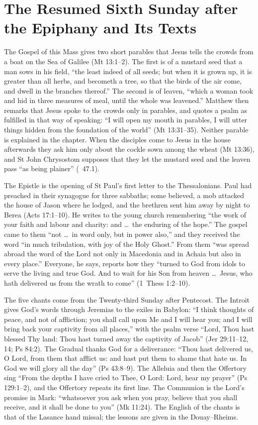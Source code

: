 \section{The Resumed Sixth Sunday after the Epiphany and Its Texts}
\label{sec:opening}

The Gospel of this Mass gives two short parables that Jesus tells the crowds
from a boat on the Sea of Galilee (Mt 13:1--2). The first is of a mustard seed
that a man sows in his field, ``the least indeed of all seeds; but when it is
grown up, it is greater than all herbs, and becometh a tree, so that the birds
of the air come, and dwell in the branches thereof.'' The second is of leaven,
``which a woman took and hid in three measures of meal, until the whole was
leavened.'' Matthew then remarks that Jesus spoke to the crowds only in
parables, and quotes a psalm as fulfilled in that way of speaking: ``I will
open my mouth in parables, I will utter things hidden from the foundation of
the world'' (Mt 13:31--35). Neither parable is explained in the chapter. When
the disciples come to Jesus in the house afterwards they ask him only about
the cockle sown among the wheat (Mt 13:36), and St John Chrysostom supposes
that they let the mustard seed and the leaven pass ``as being plainer''
(~47.1).

The Epistle is the opening of St Paul's first letter to the Thessalonians.
Paul had preached in their synagogue for three sabbaths; some believed, a mob
attacked the house of Jason where he lodged, and the brethren sent him away by
night to Berea (Acts 17:1--10). He writes to the young church remembering ``the
work of your faith and labour and charity: and \dots\ the enduring of the
hope.'' The gospel came to them ``not \dots\ in word only, but in power also,''
and they received the word ``in much tribulation, with joy of the Holy Ghost.''
From them ``was spread abroad the word of the Lord not only in Macedonia and in
Achaia but also in every place.'' Everyone, he says, reports how they ``turned
to God from idols to serve the living and true God. And to wait for his Son
from heaven \dots\ Jesus, who hath delivered us from the wrath to come'' (1~Thess
1:2--10).

The five chants come from the Twenty-third Sunday after Pentecost. The Introit
gives God's words through Jeremias to the exiles in Babylon: ``I think thoughts
of peace, and not of affliction; you shall call upon Me and I will hear you;
and I will bring back your captivity from all places,'' with the psalm verse
``Lord, Thou hast blessed Thy land: Thou hast turned away the captivity of
Jacob'' (Jer 29:11--12, 14; Ps 84:2). The Gradual thanks God for a deliverance:
``Thou hast delivered us, O Lord, from them that afflict us: and hast put them
to shame that hate us. In God we will glory all the day'' (Ps 43:8--9). The
Alleluia and then the Offertory sing ``From the depths I have cried to Thee, O
Lord: Lord, hear my prayer'' (Ps 129:1--2), and the Offertory repeats its first
line. The Communion is the Lord's promise in Mark: ``whatsoever you ask when you
pray, believe that you shall receive, and it shall be done to you'' (Mk 11:24).
The English of the chants is that of the Lasance hand missal; the lessons are
given in the Douay--Rheims.

